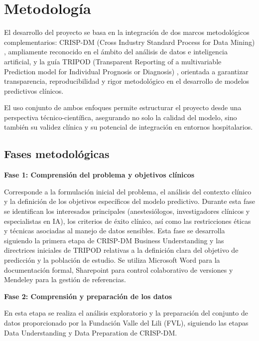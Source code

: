 \documentclass[12pt, letterpaper]{article}
\begin{document}
\newpage

\section{Metodología}

El desarrollo del proyecto se basa en la integración de dos marcos metodológicos complementarios: CRISP-DM (Cross Industry Standard Process for Data Mining) \cite{crispdm1999}, ampliamente reconocido en el ámbito del análisis de datos e inteligencia artificial, y la guía TRIPOD (Transparent Reporting of a multivariable Prediction model for Individual Prognosis or Diagnosis) \cite{collins2015}, orientada a garantizar transparencia, reproducibilidad y rigor metodológico en el desarrollo de modelos predictivos clínicos.

El uso conjunto de ambos enfoques permite estructurar el proyecto desde una perspectiva técnico-científica, asegurando no solo la calidad del modelo, sino también su validez clínica y su potencial de integración en entornos hospitalarios.

\subsection{Fases metodológicas}

\textbf{Fase 1: Comprensión del problema y objetivos clínicos}

Corresponde a la formulación inicial del problema, el análisis del contexto clínico y la definición de los objetivos específicos del modelo predictivo. Durante esta fase se identifican los interesados principales (anestesiólogos, investigadores clínicos y especialistas en IA), los criterios de éxito clínico, así como las restricciones éticas y técnicas asociadas al manejo de datos sensibles. Esta fase se desarrolla siguiendo la primera etapa de CRISP-DM Business Understanding y las directrices iniciales de TRIPOD relativas a la definición clara del objetivo de predicción y la población de estudio. Se utiliza Microsoft Word para la documentación formal, Sharepoint para control colaborativo de versiones y Mendeley para la gestión de referencias.

\textbf{Fase 2: Comprensión y preparación de los datos}

En esta etapa se realiza el análisis exploratorio y la preparación del conjunto de datos proporcionado por la Fundación Valle del Lili (FVL), siguiendo las etapas Data Understanding y Data Preparation de CRISP-DM.
\end{document}
